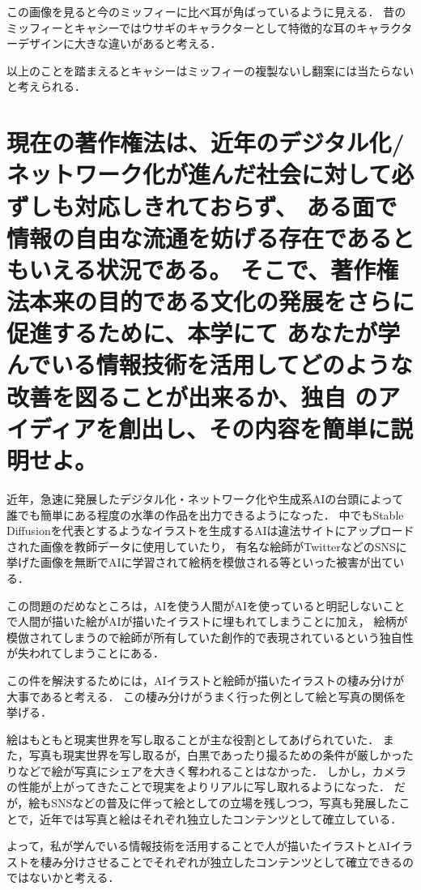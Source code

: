 \documentclass[titlepage,a4paper]{jsarticle}
\begin{document}
この画像を見ると今のミッフィーに比べ耳が角ばっているように見える．
昔のミッフィーとキャシーではウサギのキャラクターとして特徴的な耳のキャラクターデザインに大きな違いがあると考える．

以上のことを踏まえるとキャシーはミッフィーの複製ないし翻案には当たらないと考えられる．
\newpage
\section{現在の著作権法は、近年のデジタル化/ネットワーク化が進んだ社会に対して必ずしも対応しきれておらず、
  ある面で情報の自由な流通を妨げる存在であるともいえる状況である。
  そこで、著作権法本来の目的である文化の発展をさらに促進するために、本学にて
  あなたが学んでいる情報技術を活用してどのような改善を図ることが出来るか、独自
  のアイディアを創出し、その内容を簡単に説明せよ。}
近年，急速に発展したデジタル化・ネットワーク化や生成系AIの台頭によって誰でも簡単にある程度の水準の作品を出力できるようになった．
中でもStable Diffusionを代表とするようなイラストを生成するAIは違法サイトにアップロードされた画像を教師データに使用していたり，
有名な絵師がTwitterなどのSNSに挙げた画像を無断でAIに学習されて絵柄を模倣される等といった被害が出ている．

この問題のだめなところは，AIを使う人間がAIを使っていると明記しないことで人間が描いた絵がAIが描いたイラストに埋もれてしまうことに加え，
絵柄が模倣されてしまうので絵師が所有していた創作的で表現されているという独自性が失われてしまうことにある．

この件を解決するためには，AIイラストと絵師が描いたイラストの棲み分けが大事であると考える．
この棲み分けがうまく行った例として絵と写真の関係を挙げる．

絵はもともと現実世界を写し取ることが主な役割としてあげられていた．
また，写真も現実世界を写し取るが，白黒であったり撮るための条件が厳しかったりなどで絵が写真にシェアを大きく奪われることはなかった．
しかし，カメラの性能が上がってきたことで現実をよりリアルに写し取れるようになった．
だが，絵もSNSなどの普及に伴って絵としての立場を残しつつ，写真も発展したことで，近年では写真と絵はそれぞれ独立したコンテンツとして確立している．

よって，私が学んでいる情報技術を活用することで人が描いたイラストとAIイラストを棲み分けさせることでそれぞれが独立したコンテンツとして確立できるのではないかと考える．
\end{document}
